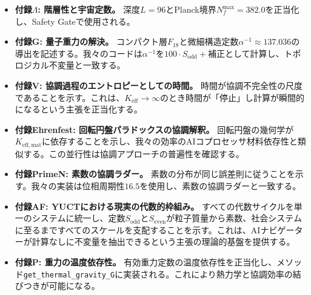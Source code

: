 \documentclass[11pt,a4paper]{article}
\begin{document}
\begin{itemize}
		\item \textbf{付録\(\Lambda\): 階層性と宇宙定数。}  
		深度\(L = 96\)とPlanck境界\(N_f^{\max} = 382.0\)を正当化し、Safety Gateで使用される。
		
		\item \textbf{付録G: 量子重力の解決。}  
		コンパクト層\(F_{18}\)と微細構造定数\(\alpha^{-1} \approx 137.036\)の導出を記述する。我々のコードは\(\alpha^{-1}\)を\(100 \cdot S_{\mathrm{odd}} + \text{補正}\)として計算し、トポロジカル不変量と一致する。
		
		\item \textbf{付録V: 協調過程のエントロピーとしての時間。}  
		時間が協調不完全性の尺度であることを示す。これは、\(K_{\mathrm{eff}} \to \infty\)のとき時間が「停止」し計算が瞬間的になるという主張を正当化する。
		
		\item \textbf{付録Ehrenfest: 回転円盤パラドックスの協調解釈。}  
		回転円盤の幾何学が\(K_{\mathrm{eff,mat}}\)に依存することを示し、我々の効率のAIコプロセッサ材料依存性と類似する。この並行性は協調アプローチの普遍性を確認する。
		
		\item \textbf{付録PrimeN: 素数の協調ラダー。}  
		素数の分布が同じ誤差則に従うことを示す。我々の実装は位相周期性\(16.5\)を使用し、素数の協調ラダーと一致する。
		
		\item \textbf{付録AF: YUCTにおける現実の代数的枠組み。}  
		すべての代数サイクルを単一のシステムに統一し、定数\(S_{\mathrm{odd}}\)と\(S_{\mathrm{even}}\)が粒子質量から素数、社会システムに至るまですべてのスケールを支配することを示す。これは、AIナビゲーターが計算なしに不変量を抽出できるという主張の理論的基盤を提供する。
		
		\item \textbf{付録P: 重力の温度依存性。}  
		有効重力定数の温度依存性を正当化し、メソッド\texttt{get\_thermal\_gravity\_G}に実装される。これにより熱力学と協調効率の結びつきが可能になる。
	\end{itemize}
	
\end{document}
